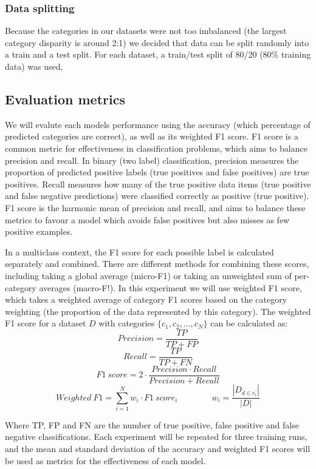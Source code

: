 \documentclass{l4proj}
\begin{document}
\subsubsection{Data splitting} \hfill \par
Because the categories in our datasets were not too imbalanced (the largest category disparity is around 2:1) we decided that data can be split randomly into a train and a test split. For each dataset, a train/test split of 80/20 (80\% training data) was used,

\subsection{Evaluation metrics}
We will evalute each models performance using the accuracy (which percentage of predicted categories are correct), as well as its weighted F1 score. F1 score is a common metric for effectiveness in classification problems, which aims to balance precision and recall. In binary (two label) classification, precision measures the proportion of predicted positive labels (true positives and false positives) are true positives. Recall measures how many of the true positive data items (true positive and false negative predictions) were classified correctly as positive (true positive). F1 score is the harmonic mean of precision and recall, and aims to balance these metrics to favour a model which avoids false positives but also misses as few positive examples. \par
In a multiclass context, the F1 score for each possible label is calculated separately and combined. There are different methods for combining these scores, including taking a global average (micro-F1) or taking an unweighted sum of per-category averages (macro-F!). In this experiment we will use weighted F1 score, which takes a weighted average of category F1 scores based on the category weighting (the proportion of the data represented by this category). The weighted F1 score for a dataset $D$ with categories $\{c_1, c_2, ..., c_N\}$ can be calculated as:
$$Precision=\frac{TP}{TP+FP}$$ 
$$Recall=\frac{TP}{TP+FN}
$$ $$F1 \ score=2 \cdot \frac{Precision \cdot Recall}{Precision + Recall}$$
$$Weighted \ F1=\sum_{i=1}^{N}w_i \cdot F1 \ score_i \quad \quad \quad \quad w_i=\frac{|D_{d \in c_i}|}{|D|}$$

Where TP, FP and FN are the number of true positive, false positive and false negative classifications. Each experiment will be repeated for three training runs, and the mean and standard deviation of the accuracy and weighted F1 scores will be used as metrics for the effectiveness of each model.
\end{document}
